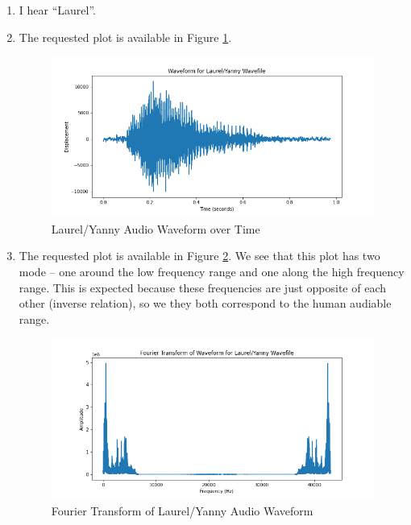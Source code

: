 \documentclass[12pt]{article}
\begin{document}
\begin{enumerate}[label=(\alph*)]
  \item
    I hear ``Laurel''.
  \item The requested plot is available in Figure \ref{fig:laurel_yanny_waveform}.
    \begin{figure}[!ht]
      \centering
      \includegraphics[scale=0.5]{figures/laurel_yanny_waveform.png}
      \caption{Laurel/Yanny Audio Waveform over Time}
      \label{fig:laurel_yanny_waveform}
    \end{figure}

  \item
    The requested plot is available in Figure \ref{fig:laurel_yanny_waveform_fft}. We see that this plot has two mode -- one around the low frequency range and one along the high frequency range. This is expected because these frequencies are just opposite of each other (inverse relation), so we they both correspond to the human audiable range.
    \begin{figure}[!ht]
      \centering
      \includegraphics[scale=0.5]{figures/laurel_yanny_waveform_fft.png}
      \caption{Fourier Transform of Laurel/Yanny Audio Waveform}
      \label{fig:laurel_yanny_waveform_fft}
    \end{figure}


\end{enumerate}
\end{document}
